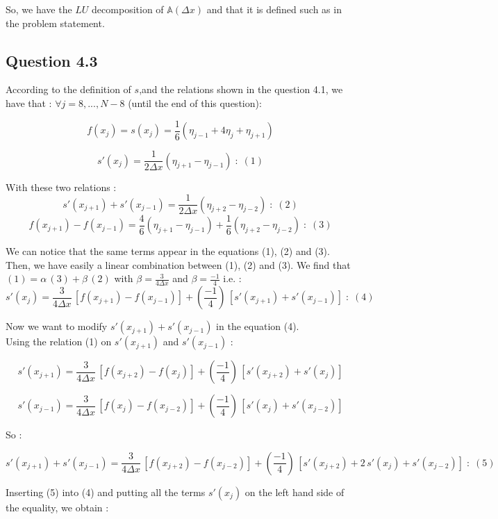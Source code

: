 \documentclass[10pt]{article}
\begin{document}
So, we have the $LU$ decomposition of $\mathbb{A}(\Delta x)$ and that it is defined such as in the problem statement.


\subsection{Question 4.3}


According to the definition of $s$,and the relations shown in the question 4.1, we have that : $ \forall j=8,...,N-8$ (until the end of this question):

$$f(x_j) = s(x_j) = \frac{1}{6} \left( \eta_{j-1} + 4 \eta_{j} + \eta_{j+1} \right)$$

$$s'(x_j)= \frac{1}{2\Delta x} \left( \eta_{j+1} - \eta_{j-1} \right)\; :\; (1)$$

With these two relations :
$$s'(x_{j+1}) + s'(x_{j-1})= \frac{1}{2\Delta x} \left( \eta_{j+2} - \eta_{j-2} \right)\;:\; (2)$$
$$f(x_{j+1}) - f(x_{j-1})= \frac{4}{6} \left( \eta_{j+1} - \eta_{j-1} \right) + \frac{1}{6} \left( \eta_{j+2} - \eta_{j-2} \right) \;:\;(3)$$

We can notice that the same terms appear in the equations (1), (2) and (3). Then, we have easily a linear combination between (1), (2) and (3). We find that $(1) = \alpha\,(3) + \beta\,(2)$ with $\beta=\frac{3}{4 \Delta x}$ and $\beta=\frac{-1}{4}$ i.e. : \\
$$s'(x_j)=\frac{3}{4 \Delta x}\, \left[ f(x_{j+1}) - f(x_{j-1}) \right] + \left( \frac{-1}{4} \right)\, \left[ s'(x_{j+1}) + s'(x_{j-1}) \right] \;:\; (4)$$


Now we want to modify $s'(x_{j+1})+ s'(x_{j-1})$ in the equation (4).\\

Using the relation (1) on $s'(x_{j+1})$ and $s'(x_{j-1})$ :

$$s'(x_{j+1})=\frac{3}{4 \Delta x}\, \left[ f(x_{j+2}) - f(x_{j}) \right] + \left( \frac{-1}{4} \right)\, \left[ s'(x_{j+2}) + s'(x_{j}) \right]$$

$$s'(x_{j-1})=\frac{3}{4 \Delta x}\, \left[ f(x_{j}) - f(x_{j-2}) \right] + \left( \frac{-1}{4} \right)\, \left[ s'(x_{j}) + s'(x_{j-2}) \right]$$

So :

$$s'(x_{j+1}) + s'(x_{j-1}) =\frac{3}{4 \Delta x}\, \left[ f(x_{j+2}) - f(x_{j-2}) \right] + \left( \frac{-1}{4} \right)\, \left[ s'(x_{j+2})+ 2\, s'(x_{j}) + s'(x_{j-2}) \right] \;:\; (5) $$

Inserting (5) into (4) and putting all the terms $s'(x_j)$ on the left hand side of the equality, we obtain :
\end{document}
